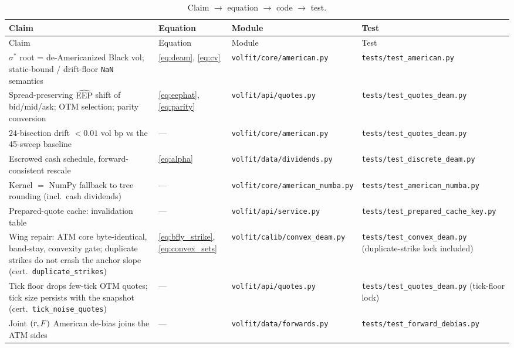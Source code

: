 \documentclass[11pt]{article}
\begin{document}
\begin{longtable}{p{}p{}p{}p{}}
\caption{Claim $\to$ equation $\to$ code $\to$ test.}\label{tab:trace}\\
\toprule Claim & Equation & Module & Test\\ \midrule
\endfirsthead \toprule Claim & Equation & Module & Test\\ \midrule \endhead
$\sigma^*$ root = de-Americanized Black vol; static-bound / drift-floor
\texttt{NaN} semantics & \eqref{eq:deam}, \eqref{eq:cv} &
\texttt{volfit/core/american.py} & \texttt{tests/test\_american.py}\\
Spread-preserving $\widehat{\mathrm{EEP}}$ shift of bid/mid/ask; OTM selection;
parity conversion & \eqref{eq:eephat}, \eqref{eq:parity} &
\texttt{volfit/api/quotes.py} & \texttt{tests/test\_quotes\_deam.py}\\
$24$-bisection drift $<0.01$ vol bp vs the 45-sweep baseline & --- &
\texttt{volfit/core/american.py} & \texttt{tests/test\_quotes\_deam.py}\\
Escrowed cash schedule, forward-consistent rescale & \eqref{eq:alpha} &
\texttt{volfit/data/dividends.py} & \texttt{tests/test\_discrete\_deam.py}\\
Kernel $=$ NumPy fallback to tree rounding (incl.\ cash dividends) & --- &
\texttt{volfit/core/american\_numba.py} & \texttt{tests/test\_american\_numba.py}\\
Prepared-quote cache: invalidation table & --- &
\texttt{volfit/api/service.py} & \texttt{tests/test\_prepared\_cache\_key.py}\\
Wing repair: ATM core byte-identical, band-stay, convexity gate; duplicate
strikes do not crash the anchor slope (cert.\ \texttt{duplicate\_strikes}) &
\eqref{eq:bfly_strike}, \eqref{eq:convex_sets} &
\texttt{volfit/calib/convex\_deam.py} & \texttt{tests/test\_convex\_deam.py}
(duplicate-strike lock included)\\
Tick floor drops few-tick OTM quotes; tick size persists with the snapshot
(cert.\ \texttt{tick\_noise\_quotes}) &
--- &
\texttt{volfit/api/quotes.py} &
\texttt{tests/test\_quotes\_deam.py} (tick-floor lock)\\
Joint $(r,F)$ American de-bias joins the ATM sides & --- &
\texttt{volfit/data/forwards.py} & \texttt{tests/test\_forward\_debias.py}\\
\bottomrule
\end{longtable}
\end{document}
